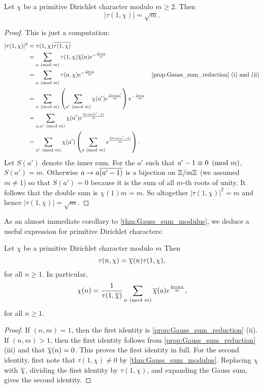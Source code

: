         \begin{theorem}\label{thm:Gauss_sum_modulus}
          Let $\chi$ be a primitive Dirichlet character modulo $m \ge 2$. Then
          \[
            |\tau(1,\chi)| = \sqrt{m}.
          \]
        \end{theorem}
        \begin{proof}
          This is just a computation:
          \begin{align*}
            |\tau(1,\chi)|^{2} &= \tau(1,\chi)\conj{\tau(1,\chi)} \\
            &= \sum_{a \tmod{m}}\tau(1,\chi)\cchi(a)e^{-\frac{2\pi ia}{m}} \\
            &=  \sum_{a \tmod{m}}\tau(a,\chi)e^{-\frac{2\pi ia}{m}} & \text{\cref{prop:Gauss_sum_reduction} (i) and (ii)} \\
            &= \sum_{a \tmod{m}}\left(\sum_{a' \tmod{m}}\chi(a')e^{\frac{2\pi iaa'}{m}}\right)e^{-\frac{2\pi ia}{m}} \\
            &= \sum_{a,a' \tmod{m}}\chi(a')e^{\frac{2\pi ia(a'-1)}{m}} \\
            &= \sum_{a' \tmod{m}}\chi(a')\left(\sum_{a \tmod{m}}e^{\frac{2\pi ia(a'-1)}{m}}\right).
          \end{align*}
          Let $S(a')$ denote the inner sum. For the $a'$ such that $a'-1 \equiv 0 \ \left(\text{mod }m\right)$, $S(a') = m$. Otherwise $a \to a\overline{(a'-1)}$ is a bijection on $\mathbb{Z}/m\mathbb{Z}$ (we assumed $m \neq 1$) so that $S(a') = 0$ because it is the sum of all $m$-th roots of unity. It follows that the double sum is $\chi(1)m = m$. So altogether $|\tau(1,\chi)|^{2} = m$ and hence $|\tau(1,\chi)| = \sqrt{m}$.
        \end{proof}

        As an almost immediate corollary to \cref{thm:Gauss_sum_modulus}, we deduce a useful expression for primitive Dirichlet characters:

        \begin{corollary}
          Let $\chi$ be a primitive Dirichlet character modulo $m$ Then
          \[
            \tau(n,\chi) = \overline{\chi}(n)\tau(1,\chi),
          \]
          for all $n \ge 1$. In particular,
          \[
            \chi(n) = \frac{1}{\tau(1,\overline{\chi})}\sum_{a \ \left(\text{mod }m\right)}\overline{\chi}(a)e^{\frac{2\pi ian}{m}},
          \]
          for all $n \ge 1$.
        \end{corollary}
        \begin{proof}
          If $(n,m) = 1$, then the first identity is \cref{prop:Gauss_sum_reduction} (ii). If $(n,m) > 1$, then the first identity follows from \cref{prop:Gauss_sum_reduction} (iii) and that $\overline{\chi}(n) = 0$. This proves the first identity in full. For the second identity, first note that $\tau(1,\chi) \neq 0$ by \cref{thm:Gauss_sum_modulus}. Replacing $\chi$ with $\overline{\chi}$, dividing the first identity by $\tau(1,\chi)$, and expanding the Gauss sum, gives the second identity.
        \end{proof}

